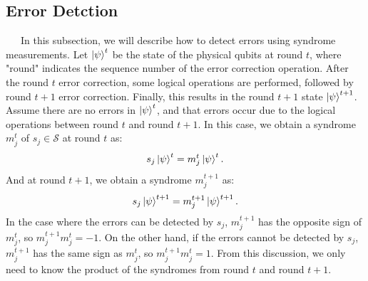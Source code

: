 \documentclass[a4paper,11pt]{ltjsarticle}
\begin{document}
{{        \subsection{Error Detction}{
            \ \ \ In this subsection, we will describe how to detect errors using syndrome measurements. Let $\ket{\psi}^t$ be the state of the physical qubits at round $t$, where "round" indicates the sequence number of the error correction operation. After the round $t$ error correction, some logical operations are performed, followed by round $t+1$ error correction. Finally, this results in the round $t+1$ state $\ket{\psi}^{t+1}$. Assume there are no errors in $\ket{\psi}^t$, and that errors occur due to the logical operations between round $t$ and round $t+1$. In this case, we obtain a syndrome $m^t_j$ of $s_j \in \mathcal{S}$ at round $t$ as:
            \begin{align*}
                s_j\ket{\psi}^t=m_j^t\ket{\psi}^t.
            \end{align*}
            And at round $t+1$, we obtain a syndrome $m^{t+1}_j$ as:
            \begin{align*}
                s_j\ket{\psi}^{t+1}=m_j^{t+1}\ket{\psi}^{t+1}.
            \end{align*}
            In the case where the errors can be detected by $s_j$, $m_j^{t+1}$ has the opposite sign of $m_j^t$, so $m_j^{t+1}m_j^t = -1$. On the other hand, if the errors cannot be detected by $s_j$, $m_j^{t+1}$ has the same sign as $m_j^t$, so $m_j^{t+1}m_j^t = 1$. From this discussion, we only need to know the product of the syndromes from round $t$ and round $t+1$.


        }
        



    }
}
\end{document}
